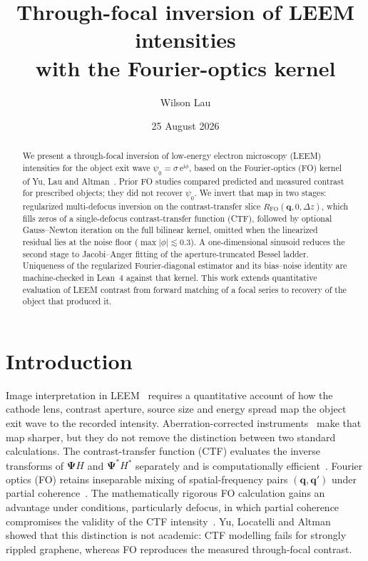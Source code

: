 \documentclass[11pt,a4paper]{article}
\title{Through-focal inversion of LEEM intensities\\
with the Fourier-optics kernel}
\author{Wilson Lau}
\date{25 August 2026}
\theoremstyle{definition}
\theoremstyle{remark}
\newcommand{\ee}{\mathrm{e}}
\newcommand{\ii}{\mathrm{i}}
\newcommand{\abs}[1]{\lvert#1\rvert}
\newcommand{\Dz}{\Delta z}
\newcommand{\RFO}{R_{\mathrm{FO}}}
\begin{document}
\maketitle

\begin{abstract}
We present a through-focal inversion of low-energy electron microscopy
(LEEM) intensities for the object exit wave
$\psi_0=\sigma\,\ee^{\ii\phi}$, based on the Fourier-optics (FO) kernel
of Yu, Lau and Altman~\cite{Yu2019}.
Prior FO studies compared predicted and measured contrast for prescribed
objects; they did not recover $\psi_0$.
We invert that map in two stages: regularized multi-defocus inversion
on the contrast-transfer slice $\RFO(\mathbf{q},0,\Dz)$, which fills
zeros of a single-defocus contrast-transfer function (CTF), followed
by optional Gauss--Newton iteration on the full bilinear kernel,
omitted when the linearized residual lies at the noise floor
($\max\abs{\phi}\lesssim 0.3$).
A one-dimensional sinusoid reduces the second stage to Jacobi--Anger
fitting of the aperture-truncated Bessel ladder.
Uniqueness of the regularized Fourier-diagonal estimator and its
bias--noise identity are machine-checked in Lean~4 against that kernel.
This work extends quantitative evaluation of LEEM contrast from forward
matching of a focal series to recovery of the object that produced it.
\end{abstract}

\section{Introduction}
\label{sec:intro}

Image interpretation in LEEM~\cite{Bauer1994,Bauer2014,Tromp2000,Altman2010}
requires a quantitative account of how the cathode lens, contrast
aperture, source size and energy spread map the object exit wave to
the recorded intensity.
Aberration-corrected instruments~\cite{Tromp2010,Tromp2013} make that
map sharper, but they do not remove the distinction between two
standard calculations.
The contrast-transfer function (CTF) evaluates the inverse transforms
of $\boldsymbol{\Psi}H$ and $\boldsymbol{\Psi}^*H^*$ separately and is computationally
efficient~\cite{Schramm2012,Tromp2012}.
Fourier optics (FO) retains inseparable mixing of spatial-frequency
pairs $(\mathbf{q},\mathbf{q}')$ under partial
coherence~\cite{Pang2009,Yu2017,Yu2019}.
The mathematically rigorous FO calculation gains an advantage under
conditions, particularly defocus, in which partial coherence
compromises the validity of the CTF intensity~\cite{Yu2019}.
Yu, Locatelli and Altman~\cite{Yu2017} showed that this distinction is
not academic: CTF modelling fails for strongly rippled graphene,
whereas FO reproduces the measured through-focal contrast.
\end{document}
